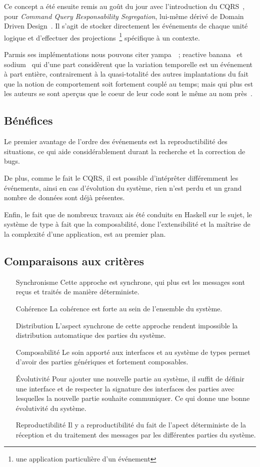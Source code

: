 \documentclass{article}
\begin{document}
Ce concept a été ensuite remis au goût du jour avec l'introduction du CQRS~\cite{cqrs},
pour \emph{Command Query Responsability Segregation}, lui-même dérivé de
Domain Driven Design~\cite{ddd}.
Il s'agit de stocker directement les événements de chaque unité logique et d'effectuer
des projections~\footnote{une application particulière d'un événement} spécifique à un contexte.

Parmis ses implémentations nous pouvons citer yampa~\cite{yampa}~\cite{arrows};
reactive banana~\cite{reactivebanana} et sodium~\cite{sodium} qui d'une part considèrent que
la variation temporelle est un événement à part entière, contrairement à
la quasi-totalité des autres implantations du fait que la notion de
comportement soit fortement couplé au temps; mais qui plus est les
auteurs se sont aperçus que le coeur de leur code sont le même au nom
près~\cite{sodium_talk}.

\subsection{Bénéfices}\label{bénéfices-1}

Le premier avantage de l'ordre des événements est la reproductibilité
des situations, ce qui aide considérablement durant la recherche et la
correction de bugs.

De plus, comme le fait le CQRS, il est possible d'intéprêter différemment
les événements, ainsi en cas d'évolution du système, rien n'est perdu et
un grand nombre de données sont déjà présentes.

Enfin, le fait que de nombreux travaux ais été conduits en Haskell sur
le sujet, le système de type à fait que la composabilité, donc
l'extensibilité et la maîtrise de la complexité d'une application, est
au premier plan.

\subsection{Comparaisons aux critères}
\begin{itemize}
    \item[Synchronisme] Cette approche est synchrone, qui plus est les messages
sont reçus et traités de manière déterministe.
    \item[Cohérence] La cohérence est forte au sein de l'ensemble du système.
    \item[Distribution] L'aspect synchrone de cette approche rendent impossible la distribution  
automatique des parties du système.
    \item[Composabilité] Le soin apporté aux interfaces et au système de types
permet d'avoir des parties génériques et fortement composables.
    \item[Évolutivité] Pour ajouter une nouvelle partie au système, il suffit de
définir une interface et de respecter la signature des interfaces des parties
avec lesquelles la nouvelle partie souhaite communiquer. Ce qui donne une bonne
évolutivité du système.
    \item[Reproductibilité] Il y a reproductibilité du fait de l'apect déterministe
de la réception et du traitement des messages par les différentes parties du système.
\end{itemize}
\end{document}
